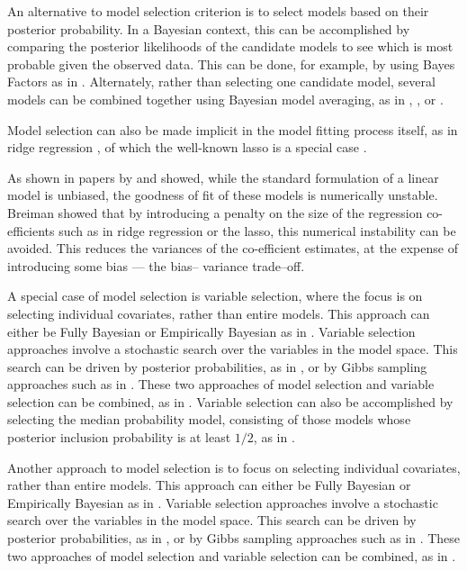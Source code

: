 \documentclass{amsart}[12pt]
\begin{document}
An alternative to model selection criterion is to select models based on their posterior probability. In a
Bayesian context, this can be accomplished by comparing the posterior likelihoods of the candidate models to
see which is most probable given the observed data. This can be done, for example, by using Bayes Factors as
in \citep{Kass1993}. Alternately, rather than selecting one candidate model, several models can be combined together using Bayesian model  averaging, as in \citep{Hoeting1999}, \citep{Raftery1997}, \citep{Fernandez2001} or \citep{Papaspiliopoulos2016}.

Model selection can also be made implicit in the model fitting process itself, as in ridge regression
\citep{Casella1980}, of which the well-known lasso is a special case \citep{Tibshirani1996}.

As shown in
papers by \citep{Breiman1996} and \citep{Efron2013} showed, while  the standard formulation of a linear model
is unbiased, the goodness of fit of these models is numerically  unstable. Breiman showed that by introducing
a penalty on the size of the regression co- efficients such as  in ridge regression or the lasso, this numerical
instability can be avoided. This reduces the variances of the co-efficient estimates, at the expense of
introducing some bias --- the bias-- variance trade--off.

A special case of model selection is variable selection, where the focus is on selecting individual
covariates, rather than entire models. This approach can either be Fully Bayesian or Empirically Bayesian as
in \citep{Cui2008}. Variable selection approaches involve a stochastic search over the variables in the model
space. This search can be driven by posterior probabilities, as in \citep{Casella2006}, or by Gibbs sampling
approaches such as in \citep{George1993}. These two approaches of model selection and variable selection can
be combined, as in \citep{Geweke1996}. Variable selection can also be accomplished by selecting the median
probability model, consisting of those models whose posterior inclusion probability is at least $1/2$, as in
\citep{Barbieri2004}.

Another approach to model selection is to focus on selecting individual covariates, rather than entire
models. This approach can either be Fully Bayesian or Empirically Bayesian as in \citep{Cui2008}. Variable
selection approaches involve a stochastic search over the variables in the model space. This search can be
driven by posterior probabilities, as in \citep{Casella2006}, or by Gibbs sampling approaches such as in
\citep{George1993}. These two approaches of model selection and variable selection can be combined, as in
\citep{Geweke1996}.
\end{document}
